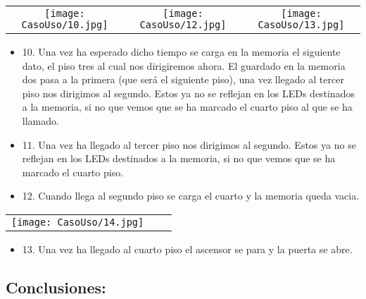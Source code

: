 	\begin{table}[H]
	\centering
	\begin{tabular}{ccc}
		 \texttt{[image: CasoUso/10.jpg]}  &
		 \texttt{[image: CasoUso/12.jpg]}   &
		 \texttt{[image: CasoUso/13.jpg]}  \\ 
	\end{tabular}
	\end{table}
	\begin{itemize}
	    \item 10.  Una vez ha esperado dicho tiempo se carga en la memoria el siguiente dato, el piso tres al cual nos dirigiremos ahora. El guardado en la memoria dos pasa a la primera (que será el siguiente piso), una vez llegado al tercer piso nos dirigimos al segundo. Estos ya no se reflejan en los LEDs destinados a la memoria, si no que vemos que se ha marcado el cuarto piso al que se ha llamado.
	    \item 11.  Una vez ha llegado al tercer piso nos dirigimos al segundo. Estos ya no se reflejan en los LEDs destinados a la memoria, si no que vemos que se ha marcado el cuarto piso.
	    \item 12. Cuando llega al segundo piso se carga el cuarto y la memoria queda vacia.
	\end{itemize}
	
	\begin{table}[H]
	\centering
	\begin{tabular}{ccc}
		 \texttt{[image: CasoUso/14.jpg]}   &  &  \\
	\end{tabular}
	\end{table}
	
	\begin{itemize}
	    \item 13. Una vez ha llegado al cuarto piso el ascensor se para y la puerta se abre.
	\end{itemize}

\subsection{Conclusiones:}